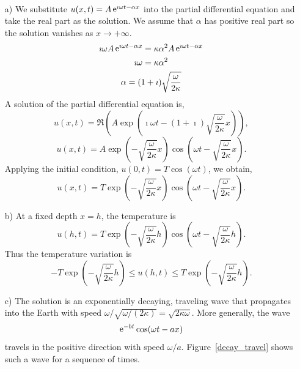 {%
\begin{Solution} $\phantom{a}$ \\
  \begin{itemize}
  \item[a)]
    We substitute $u(x,t) = A \mathop{\mathrm{e}}\nolimits^{\imath \omega t - \alpha x}$ into the partial 
    differential equation and take the real part as the solution.  We assume
    that $\alpha$ has positive real part so the solution vanishes as
    $x \to +\infty$.
    \begin{gather*}
      \imath \omega A \mathop{\mathrm{e}}\nolimits^{\imath \omega t - \alpha x} 
      = \kappa \alpha^2 A \mathop{\mathrm{e}}\nolimits^{\imath \omega t - \alpha x} \\
      \imath \omega = \kappa \alpha^2 \\
      \alpha = (1 + \imath) \sqrt{ \frac{\omega}{2 \kappa} }
    \end{gather*}
    A solution of the partial differential equation is,
    \[
    u(x,t) = \Re \left( A \exp\left( \imath \omega t - (1 + \imath) \sqrt{
          \frac{\omega}{2\kappa} } x \right) \right),
    \]
    \[
    u(x,t) = A \exp\left( - \sqrt{ \frac{\omega}{2\kappa} } x \right) 
    \cos\left( \omega t - \sqrt{ \frac{\omega}{2\kappa} } x \right).
    \]
    Applying the initial condition, $u(0,t) = T \cos(\omega t)$, we obtain,
    \[
    \boxed{
      u(x,t) = T \exp\left( - \sqrt{ \frac{\omega}{2\kappa} } x \right) 
      \cos\left( \omega t - \sqrt{ \frac{\omega}{2\kappa} } x \right).
      }
    \]
  \item[b)]
    At a fixed depth $x = h$, the temperature is
    \[
    u(h,t) = T \exp\left( - \sqrt{ \frac{\omega}{2\kappa} } h \right) 
    \cos\left( \omega t - \sqrt{ \frac{\omega}{2\kappa} } h \right).
    \]
    Thus the temperature variation is
    \[
    \boxed{
      - T \exp\left( - \sqrt{ \frac{\omega}{2\kappa} } h \right) 
      \leq u(h,t) \leq
      T \exp\left( - \sqrt{ \frac{\omega}{2\kappa} } h \right).
      }
    \]
  \item[c)]
    The solution is an exponentially decaying, traveling wave that propagates 
    into the Earth with speed 
    $\omega/\sqrt{\omega/(2\kappa)} = \sqrt{ 2 \kappa \omega }$.
    More generally, the wave
    \[
    \mathop{\mathrm{e}}\nolimits^{-b t} \cos(\omega t - a x)
    \]
    travels in the positive direction with speed $\omega / a$.
    Figure~\ref{decay_travel} shows such a wave for a sequence of times.


\end{itemize}
\end{Solution}}
